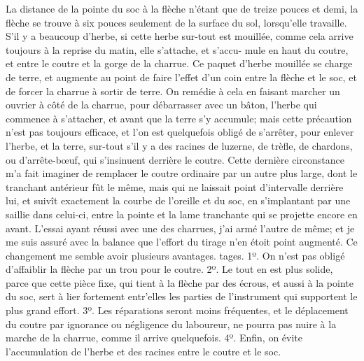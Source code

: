 La distance de la pointe du soc à la flèche n'étant que de treize pouces et demi, la flèche se trouve à six pouces seulement de la surface du sol, lorsqu'elle travaille. S'il y a beaucoup d'herbe, si cette herbe sur-tout est mouillée, comme cela arrive toujours à la reprise du matin, elle s'attache, et s'accu-\setcounter{page}{406} mule en haut du coutre, et entre le coutre et la gorge de la charrue. Ce paquet d'herbe mouillée se charge de terre, et augmente au point de faire l'effet d'un coin entre la flèche et le soc, et de forcer la charrue à sortir de terre. On remédie à cela en faisant marcher un ouvrier à côté de la charrue, pour débarrasser avec un bâton, l'herbe qui commence à s'attacher, et avant que la terre s'y accumule; mais cette précaution n'est pas toujours efficace, et l'on est quelquefois obligé de s'arrêter, pour enlever l'herbe, et la terre, sur-tout s'il y a des racines de luzerne, de trèfle, de chardons, ou d'arrête-bœuf, qui s'insinuent derrière le coutre. Cette dernière circonstance m'a fait imaginer de remplacer le coutre ordinaire par un autre plus large, dont le tranchant antérieur fût le même, mais qui ne laissait point d'intervalle derrière lui, et suivît exactement la courbe de l'oreille et du soc, en s'implantant par une saillie dans celui-ci, entre la pointe et la lame tranchante qui se projette encore en avant. L'essai ayant réussi avec une des charrues, j'ai armé l'autre de même; et je me suis assuré avec la balance que l'effort du tirage n'en étoit point augmenté. Ce changement me semble avoir plusieurs avantages.\setcounter{page}{407} tages. 1º. On n'est pas obligé d'affaiblir la flèche par un trou pour le coutre. 2º. Le tout en est plus solide, parce que cette pièce fixe, qui tient à la flèche par des écrous, et aussi à la pointe du soc, sert à lier fortement entr'elles les parties de l'instrument qui supportent le plus grand effort. 3º. Les réparations seront moins fréquentes, et le déplacement du coutre par ignorance ou négligence du laboureur, ne pourra pas nuire à la marche de la charrue, comme il arrive quelquefois. 4º. Enfin, on évite l'accumulation de l'herbe et des racines entre le coutre et le soc.
